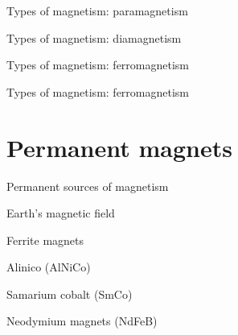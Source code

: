 \documentclass[compress]{beamer}
\begin{document}
{
    \begin{frame}{Types of magnetism: paramagnetism}
    \end{frame}
}

{
    \begin{frame}{Types of magnetism: diamagnetism}
    \end{frame}
}

{
    \begin{frame}{Types of magnetism: ferromagnetism}
    \end{frame}
}

{
    \begin{frame}{Types of magnetism: ferromagnetism}
    \end{frame}
}

\section{Permanent magnets}

{
    \begin{frame}{Permanent sources of magnetism}
    \end{frame}
}

{
    \begin{frame}{Earth's magnetic field}
    \end{frame}
}

{
    \begin{frame}{Ferrite magnets}
    \end{frame}
}

{
    \begin{frame}{Alinico (AlNiCo)}
    \end{frame}
}

{
    \begin{frame}{Samarium cobalt (SmCo)}
    \end{frame}
}

{
    \begin{frame}{Neodymium magnets (NdFeB)}
    \end{frame}
}
\end{document}
